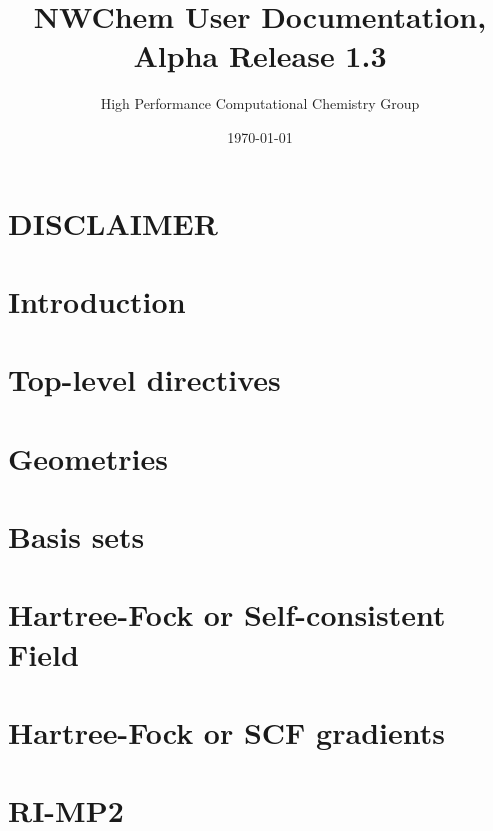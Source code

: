 \setlength{\parskip}{6pt}

\newcommand{\nwchemversion}{1.3}
\newcommand{\nwchemyear}{1996}



\title{\bf\Large NWChem User Documentation, Alpha Release \nwchemversion}
\author{High Performance Computational Chemistry Group}
\date{\today}
\maketitle

\section*{\center DISCLAIMER}


\clearpage

\tableofcontents

\clearpage

\section{Introduction}


\section{Top-level directives}


\section{Geometries}


\section{Basis sets}


\section{Hartree-Fock or Self-consistent Field} 


\section{Hartree-Fock or SCF gradients}


\section{RI-MP2}


